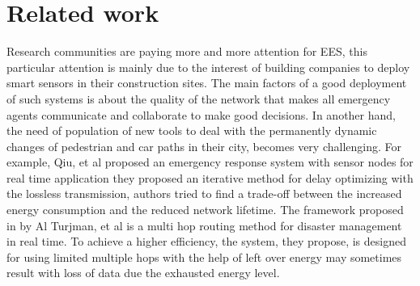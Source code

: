 \section{Related work} \label{sec:Related work}

Research communities are paying more and more attention for \ac{EES},
	this particular attention is mainly due to the interest of building companies to deploy smart sensors in their construction sites.
The main factors of a good deployment of such systems is about the quality of the network that makes all emergency agents communicate and collaborate to make good decisions.
In another hand,
	the need of population of new tools to deal with the permanently dynamic changes of pedestrian and car paths in their city,
	becomes very challenging.
For example,
	Qiu,
	et al \cite{qiu_ergid_2016} proposed an emergency response system with sensor nodes for real time application they proposed an iterative method for delay optimizing with the lossless transmission,
	authors tried to find a trade-off between the increased energy consumption and the reduced network lifetime.
The framework proposed in by Al Turjman,
	et al \cite{al-turjman_cognitive_2019} is a multi hop routing method for disaster management in real time.
To achieve a higher efficiency,
	the system,
	they propose,
	is designed for using limited multiple hops with the help of left over energy may sometimes result with loss of data due the exhausted energy level.





